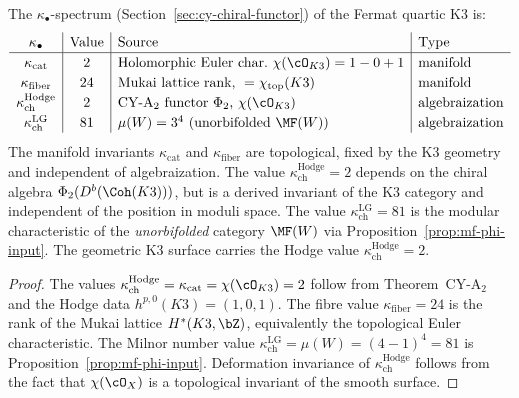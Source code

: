 \begin{proposition}
\label{prop:mf-fermat-kappa}
The $\kappa_\bullet$-spectrum (Section~\ref{sec:cy-chiral-functor}) of the Fermat quartic K3 is:
\[
 \renewcommand{\arraystretch}{1.2}
 \begin{array}{c|c|l|l}
 \kappa_\bullet & \text{Value} & \text{Source} & \text{Type} \\
 \hline
 \kappa_{\mathrm{cat}} & 2 & \text{Holomorphic Euler char.\ } \chi(\cO_{K3}) = 1 - 0 + 1 & \text{manifold} \\
 \kappa_{\mathrm{fiber}} & 24 & \text{Mukai lattice rank, } = \chi_{\mathrm{top}}(K3) & \text{manifold} \\
 \kappa_{\mathrm{ch}}^{\mathrm{Hodge}} & 2 & \text{CY-A}_2 \text{ functor } \Phi_2 \text{, } \chi(\cO_{K3}) & \text{algebraization} \\
 \kappa_{\mathrm{ch}}^{\mathrm{LG}} & 81 & \mu(W) = 3^4 \text{ (unorbifolded } \MF(W)\text{)} & \text{algebraization}
 \end{array}
\]
The manifold invariants $\kappa_{\mathrm{cat}}$ and $\kappa_{\mathrm{fiber}}$ are topological, fixed by the K3 geometry and independent of algebraization. The value $\kappa_{\mathrm{ch}}^{\mathrm{Hodge}} = 2$ depends on the chiral algebra $\Phi_2(D^b(\Coh(K3)))$, but is a derived invariant of the K3 category and independent of the position in moduli space. The value $\kappa_{\mathrm{ch}}^{\mathrm{LG}} = 81$ is the modular characteristic of the \emph{unorbifolded} category $\MF(W)$ via Proposition~\ref{prop:mf-phi-input}. The geometric K3 surface carries the Hodge value $\kappa_{\mathrm{ch}}^{\mathrm{Hodge}} = 2$.
\end{proposition}

\begin{proof}
The values $\kappa_{\mathrm{ch}}^{\mathrm{Hodge}} = \kappa_{\mathrm{cat}} = \chi(\cO_{K3}) = 2$ follow from Theorem~CY-A$_2$ and the Hodge data $h^{p,0}(K3) = (1, 0, 1)$. The fibre value $\kappa_{\mathrm{fiber}} = 24$ is the rank of the Mukai lattice $H^*(K3, \bZ)$, equivalently the topological Euler characteristic. The Milnor number value $\kappa_{\mathrm{ch}}^{\mathrm{LG}} = \mu(W) = (4-1)^4 = 81$ is Proposition~\ref{prop:mf-phi-input}. Deformation invariance of $\kappa_{\mathrm{ch}}^{\mathrm{Hodge}}$ follows from the fact that $\chi(\cO_X)$ is a topological invariant of the smooth surface.
\end{proof}

